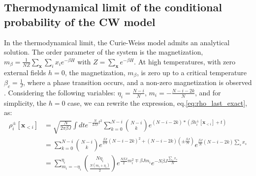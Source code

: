 \documentclass[10pt, notitlepage]{revtex4-2}
\begin{document}
\subsection{Thermodynamical limit of the conditional probability of the CW model}
In the thermodynamical limit, the Curie-Weiss model admits an analytical solution. The order parameter of the system is the magnetization, $m_{\beta}=\frac{1}{N Z}\sum_{\mathbf{x}}\sum_i x_i e^{-\beta H}$ with $Z = \sum_{\mathbf{x}} e^{-\beta H}$. At high temperatures, with zero external fields $h=0$, the magnetization, $m_{\beta}$, is zero up to a critical temperature $\beta_c=\frac{1}{J}$, where a phase transition occurs, and a non-zero magnetization is observed \cite{kadanoff2000statistical}. Considering the following variables: $\eta_i = \frac{N-i}{N}$, $m_i = -\frac{N-i-2k}{N}$, and for simplicity, the $h=0$ case, we can rewrite the expression, eq.\ref{eq:rho_last_exact}, as:
\begin{align}
    \rho_i^{\pm}[\mathbf{x}_{<i}] &= \sqrt{\frac{N}{2\pi \beta J}}\int dt e^{-\frac{N}{2J \beta}t^{2}} 
    \sum_{k=0}^{N-i} \binom{N-i}{k} e^{(N-i-2k)*(\beta h_i^{\pm}[\mathbf{x}_{<i}] + t)}\\ \label{eq:rho_last_exact2} &= \sum_{k=0}^{N-i} \binom{N-i}{k}e^{\frac{\beta J}{2N}\left(N-i-2k\right)^{2}+\left(N-i-2k\right)\left(\pm\frac{\beta J}{N}\right)} e^{\frac{\beta J}{N}\left(N-i-2k\right) \sum_s x_s}  \\
    &= \sum_{m_i=-\eta_i}^{\eta_i} \binom{N \eta_i}{\frac{N(m_i+\eta_i)}{2}} e^{\frac{N \beta J}{2}m_i^{2} \mp \beta J m_i } e^{- N \beta J \frac{\sum_s x_s}{N}}
\end{align}    
\end{document}

